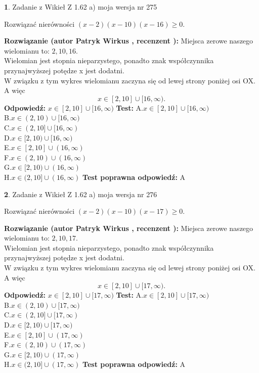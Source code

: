 \documentclass[12pt, a4paper]{article}
\theoremstyle{definition} %
\newtheorem{zad}{}
\newcommand{\zadStart}[1]{\begin{zad}#1\newline}
\newcommand{\zadStop}{\end{zad}}
\newcommand{\rozwStart}[2]{\noindent \textbf{Rozwiązanie (autor #1 , recenzent #2): }\newline}
\newcommand{\rozwStop}{\newline}
\newcommand{\odpStart}{\noindent \textbf{Odpowiedź:}\newline}
\newcommand{\odpStop}{\newline}
\newcommand{\testStart}{\noindent \textbf{Test:}\newline}
\newcommand{\testStop}{\newline}
\newcommand{\kluczStart}{\noindent \textbf{Test poprawna odpowiedź:}\newline}
\newcommand{\kluczStop}{\newline}
\begin{document}
\zadStart{Zadanie z Wikieł Z 1.62 a) moja wersja nr 275}

Rozwiązać nierówności $(x-2)(x-10)(x-16)\ge0$.
\zadStop
\rozwStart{Patryk Wirkus}{}
Miejsca zerowe naszego wielomianu to: $2, 10, 16$.\\
Wielomian jest stopnia nieparzystego, ponadto znak współczynnika przy\linebreak najwyższej potędze x jest dodatni.\\ W związku z tym wykres wielomianu zaczyna się od lewej strony poniżej osi OX. A więc $$x \in [2,10] \cup [16,\infty).$$
\rozwStop
\odpStart
$x \in [2,10] \cup [16,\infty)$
\odpStop
\testStart
A.$x \in [2,10] \cup [16,\infty)$\\
B.$x \in (2,10) \cup [16,\infty)$\\
C.$x \in (2,10] \cup [16,\infty)$\\
D.$x \in [2,10) \cup [16,\infty)$\\
E.$x \in [2,10] \cup (16,\infty)$\\
F.$x \in (2,10) \cup (16,\infty)$\\
G.$x \in [2,10) \cup (16,\infty)$\\
H.$x \in (2,10] \cup (16,\infty)$
\testStop
\kluczStart
A
\kluczStop



\zadStart{Zadanie z Wikieł Z 1.62 a) moja wersja nr 276}

Rozwiązać nierówności $(x-2)(x-10)(x-17)\ge0$.
\zadStop
\rozwStart{Patryk Wirkus}{}
Miejsca zerowe naszego wielomianu to: $2, 10, 17$.\\
Wielomian jest stopnia nieparzystego, ponadto znak współczynnika przy\linebreak najwyższej potędze x jest dodatni.\\ W związku z tym wykres wielomianu zaczyna się od lewej strony poniżej osi OX. A więc $$x \in [2,10] \cup [17,\infty).$$
\rozwStop
\odpStart
$x \in [2,10] \cup [17,\infty)$
\odpStop
\testStart
A.$x \in [2,10] \cup [17,\infty)$\\
B.$x \in (2,10) \cup [17,\infty)$\\
C.$x \in (2,10] \cup [17,\infty)$\\
D.$x \in [2,10) \cup [17,\infty)$\\
E.$x \in [2,10] \cup (17,\infty)$\\
F.$x \in (2,10) \cup (17,\infty)$\\
G.$x \in [2,10) \cup (17,\infty)$\\
H.$x \in (2,10] \cup (17,\infty)$
\testStop
\kluczStart
A
\kluczStop
\end{document}
